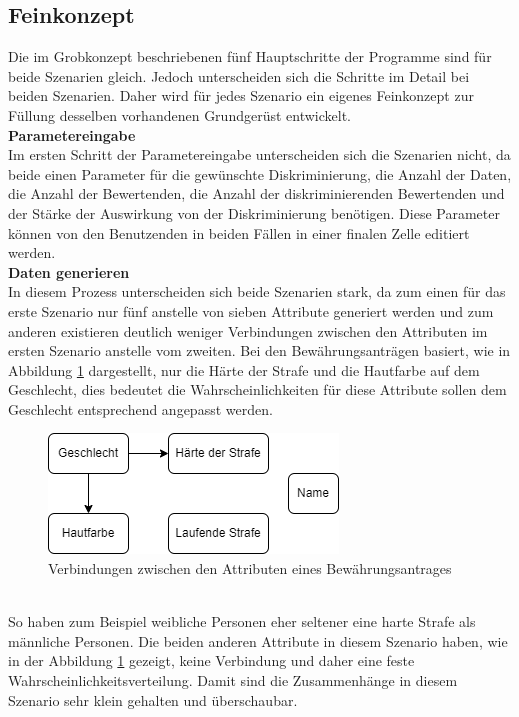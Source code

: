 \begin{onehalfspace}
\subsection{Feinkonzept}
\label{subsubsec:feinkonzept}
Die im Grobkonzept beschriebenen fünf Hauptschritte der Programme sind für beide Szenarien gleich. Jedoch unterscheiden sich die Schritte im Detail bei beiden Szenarien. Daher wird für jedes Szenario ein eigenes Feinkonzept zur Füllung desselben vorhandenen Grundgerüst entwickelt.\\
\textbf{Parametereingabe}\\
Im ersten Schritt der Parametereingabe unterscheiden sich die Szenarien nicht, da beide einen Parameter für die gewünschte Diskriminierung, die Anzahl der Daten, die Anzahl der Bewertenden, die Anzahl der diskriminierenden Bewertenden und der Stärke der Auswirkung von der Diskriminierung benötigen. Diese Parameter können von den Benutzenden in beiden Fällen in einer finalen Zelle editiert werden.\\
\textbf{Daten generieren}\\
In diesem Prozess unterscheiden sich beide Szenarien stark, da zum einen für das erste Szenario nur fünf anstelle von sieben Attribute generiert werden und zum anderen existieren deutlich weniger Verbindungen zwischen den Attributen im ersten Szenario anstelle vom zweiten. Bei den Bewährungsanträgen basiert, wie in Abbildung \ref{fig:VerbindungenS1} dargestellt, nur die Härte der Strafe und die Hautfarbe auf dem Geschlecht, dies bedeutet die Wahrscheinlichkeiten für diese Attribute sollen dem Geschlecht entsprechend angepasst werden.
\begin{figure}[h]
    \centering
    \includegraphics{Diagramme/Verbindung_der_Attribute_S1.drawio.png}
    \caption{Verbindungen zwischen den Attributen eines Bewährungsantrages}
    \label{fig:VerbindungenS1}
\end{figure}\\
So haben zum Beispiel weibliche Personen eher seltener eine harte Strafe als männliche Personen. Die beiden anderen Attribute in diesem Szenario haben, wie in der Abbildung \ref{fig:VerbindungenS1} gezeigt, keine Verbindung und daher eine feste Wahrscheinlichkeitsverteilung. Damit sind die Zusammenhänge in diesem Szenario sehr klein gehalten und überschaubar.\\

\end{onehalfspace}
